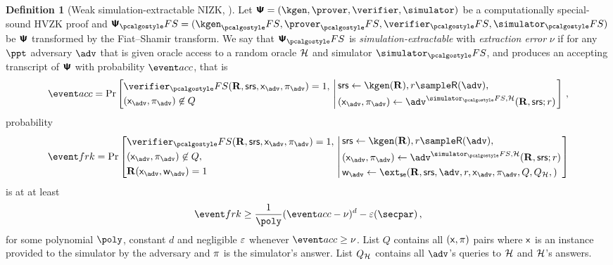\documentclass[runningheads,11pt]{llncs}
\theoremstyle{definition} \newtheorem{definition}[theorem]{Definition}
\begin{document}
\begin{definition}[Weak simulation-extractable NIZK, \cite{INDOCRYPT:FKMV12}]
	\label{def:simext}
	Let $\ps = (\kgen, \prover, \verifier, \simulator)$ be a computationally
  special-sound HVZK proof and $\ps_\fs = (\kgen_\fs, \prover_\fs,
  \verifier_\fs, \simulator_\fs)$ be $\bm{\mathsf{\Psi}}$ transformed by the Fiat--Shamir
  transform. We say that $\ps_\fs$ is \emph{simulation-extractable} with
  \emph{extraction error} $\nu$ if for any $\ppt$ adversary $\adv$ that is given
  oracle access to a random oracle $\mathcal{H}$ and simulator $\simulator_\fs$, and
  produces an accepting transcript of $\bm{\mathsf{\Psi}}$ with probability $\accProb$, that is
	\[
		\accProb = \Pr \left[
		\begin{aligned}
			& \verifier_\fs(\REL, \srs, \inp_{\advse}, \zkproof_{\advse}) = 1,\\
			& (\inp_{\advse}, \zkproof_{\advse}) \not\in Q
		\end{aligned}
		\, \left| \,
		\begin{aligned}
			& \srs \gets \kgen(\REL), r \sample \RND{\advse}, \\
			& (\inp_{\advse}, \zkproof_{\advse}) \gets \advse^{\simulator_\fs,
			\ro} (\REL, \srs; r) 
		\end{aligned}
		\right.\right]\,,
	\]
	probability
	\[
		\frkProb = \Pr \left[
		\begin{aligned}
			& \verifier_\fs(\REL, \srs, \inp_{\advse}, \zkproof_{\advse}) = 1,\\
			& (\inp_{\advse}, \zkproof_{\advse}) \not\in Q,\\
			& \REL(\inp_{\advse}, \wit_{\advse}) = 1
		\end{aligned}
		\, \left| \,
		\begin{aligned}
			& \srs \gets \kgen(\REL), r \sample \RND{\advse},\\
			& (\inp_{\advse}, \zkproof_{\advse}) \gets \advse^{\simulator_\fs,
			\ro} (\REL, \srs; r) \\
			& \wit_{\advse} \gets \ext_\se (\REL, \srs, \advse, r, \inp_{\advse}, \zkproof_{\advse},
			Q, Q_\ro,) 
		\end{aligned}
		\right.\right]
	\]
	is at at least 
	\[
		\frkProb \geq \frac{1}{\poly} (\accProb - \nu)^d - \eps(\secpar)\,,
	\]
	for some polynomial $\poly$, constant $d$ and negligible $\varepsilon$ whenever
  $\accProb \geq \nu$. List $Q$ contains all $(\mathsf{x}, \pi)$ pairs where
  $\mathsf{x}$ is an instance provided to the simulator by the adversary and
  $\pi$ is the simulator's answer. List $Q_{\mathcal{H}}$ contains all $\advse$'s
  queries to $\mathcal{H}$ and $\mathcal{H}$'s answers.
\end{definition}
\end{document}
